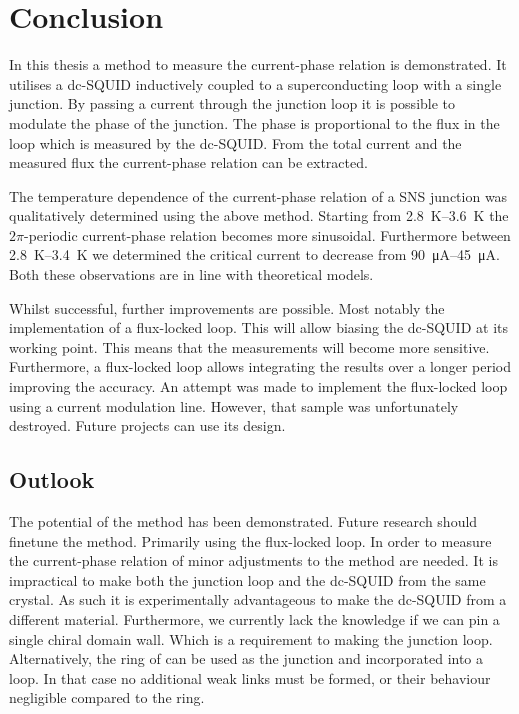 \chapter{Conclusion}
In this thesis a method to measure the current-phase relation is demonstrated. It utilises a dc-SQUID inductively coupled to a superconducting loop with a single junction. By passing a current through the junction loop it is possible to modulate the phase of the junction. The phase is proportional to the flux in the loop which is measured by the dc-SQUID. From the total current and the measured flux the current-phase relation can be extracted.

The temperature dependence of the current-phase relation of a SNS junction was qualitatively determined using the above method. Starting from \qtyrange{2.8}{3.6}{\kelvin} the $2\pi$-periodic current-phase relation becomes more sinusoidal. Furthermore between \qtyrange{2.8}{3.4}{\kelvin} we determined the critical current to decrease from \qtyrange{90}{45}{\micro\ampere}. Both these observations are in line with theoretical models.

Whilst successful, further improvements are possible. Most notably the implementation of a flux-locked loop. This will allow biasing the dc-SQUID at its working point. This means that the measurements will become more sensitive. Furthermore, a flux-locked loop allows integrating the results over a longer period improving the accuracy. An attempt was made to implement the flux-locked loop using a current modulation line. However, that sample was unfortunately destroyed. Future projects can use its design.

\section{Outlook}
The potential of the method has been demonstrated. Future research should finetune the method. Primarily using the flux-locked loop. In order to measure the current-phase relation of  minor adjustments to the method are needed. It is impractical to make both the junction loop and the dc-SQUID from the same crystal. As such it is experimentally advantageous to make the dc-SQUID from a different material. Furthermore, we currently lack the knowledge if we can pin a single chiral domain wall. Which is a requirement to making the junction loop. Alternatively, the ring of  can be used as the junction and incorporated into a loop. In that case no additional weak links must be formed, or their behaviour negligible compared to the  ring.